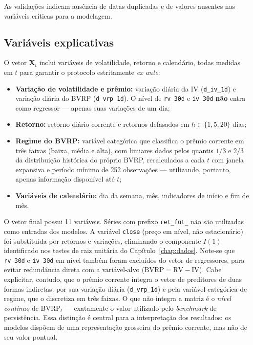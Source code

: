 As validações indicam ausência de datas duplicadas e de valores ausentes nas
variáveis críticas para a modelagem.

\subsection{Variáveis explicativas}
\label{subsec:cap5_features}

O vetor $\mathbf{X}_t$ inclui variáveis de volatilidade, retorno e calendário,
todas medidas em $t$ para garantir o protocolo estritamente \textit{ex ante}:

\begin{itemize}
    \item \textbf{Variação de volatilidade e prêmio:} variação diária da IV
    (\texttt{d\_iv\_1d}) e variação diária do BVRP (\texttt{d\_vrp\_1d}). O nível
    de \texttt{rv\_30d} e \texttt{iv\_30d} \textbf{não} entra como regressor --- apenas suas variações de um dia;
    \item \textbf{Retorno:} retorno diário corrente e retornos defasados em
    $h \in \{1, 5, 20\}$ dias;
    \item \textbf{Regime do BVRP:} variável categórica que classifica o prêmio corrente em três faixas (baixa, média e alta), com limiares dados pelos quantis $1/3$ e $2/3$ da distribuição histórica do próprio BVRP, recalculados a cada $t$ com janela expansiva e período mínimo de 252 observações --- utilizando, portanto, apenas informação disponível até $t$;
    \item \textbf{Variáveis de calendário:} dia da semana, mês, indicadores de início
    e fim de mês.
\end{itemize}

O vetor final possui 11 variáveis. Séries com prefixo \texttt{ret\_fut\_} não são
utilizadas como entradas dos modelos. A variável \texttt{close} (preço em nível,
não estacionário) foi substituída por retornos e variações, eliminando o componente
$I(1)$ identificado nos testes de raiz unitária do Capítulo~\ref{chap:dados}.
Note-se que \texttt{rv\_30d} e \texttt{iv\_30d} em nível também foram excluídos do
vetor de regressores, para evitar redundância direta com a variável-alvo
($\text{BVRP} = \text{RV} - \text{IV}$). Cabe explicitar, contudo, que o prêmio corrente integra o vetor de preditores de duas formas indiretas: por sua variação diária (\texttt{d\_vrp\_1d}) e pela variável categórica de regime, que o discretiza em três faixas. O que não integra a matriz é o \emph{nível contínuo} de BVRP$_t$ --- exatamente o valor utilizado pelo \emph{benchmark} de persistência. Essa distinção é central para a interpretação dos resultados: os modelos dispõem de uma representação grosseira do prêmio corrente, mas não de seu valor pontual.


